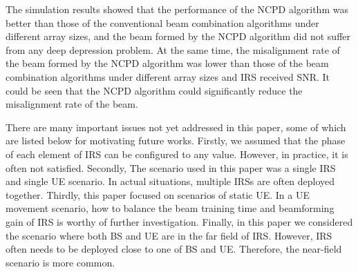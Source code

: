 \documentclass[12pt,draftclsnofoot,onecolumn]{IEEEtran}
\begin{document}
	The simulation results showed that the performance of the NCPD algorithm was better than those of the conventional  beam combination algorithms  under different array sizes, and the beam formed by the NCPD algorithm did not suffer from any deep depression  problem. At the same time, the misalignment  rate of the beam formed by the NCPD algorithm was lower than those of the beam combination algorithms under different array sizes and IRS received SNR. It could be seen that the NCPD algorithm could significantly reduce the misalignment rate of the beam.
	
	There are many important issues  not yet addressed in this paper, some of which are listed below for motivating future works.
	Firstly, we assumed that the phase of each element of IRS can be configured to  any value. However, in practice, it is often not satisfied. 
	Secondly, The scenario used in this paper was a single IRS and single UE scenario. In actual situations, multiple IRSs are often deployed together.
	Thirdly, this paper focused on scenarios of static UE. In a UE movement scenario, how to balance the beam training time and beamforming gain of IRS is worthy of further investigation.
	Finally, in this paper we considered the scenario where both  BS and  UE are in the far field of  IRS. However,  IRS often needs to be deployed close to one of  BS and UE. Therefore, the near-field scenario  is more common.
	
	
	
	
	
\end{document}
